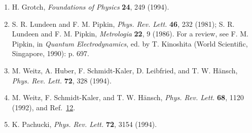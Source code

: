 \begin{enumerate}
\item \hypertarget{ref:14.10}{}H. Grotch, \emph{Foundations of Physics}
\textbf{24}, 249 (1994).

\item \hypertarget{ref:14.11}{}S. R. Lundeen and F. M. Pipkin,
\emph{Phys. Rev. Lett.} \textbf{46}, 232 (1981); S. R. Lundeen and
F. M. Pipkin, \emph{Metrologia} \textbf{22}, 9 (1986). For a review, see
F. M. Pipkin, in \emph{Quantum Electrodynamics}, ed. by T. Kinoshita (World
Scientific, Singapore, 1990): p. 697.

\item \hypertarget{ref:14.12}{}M. Weitz, A. Huber, F. Schmidt-Kaler,
D. Leibfried, and T. W. H\"ansch, \emph{Phys. Rev. Lett.} \textbf{72}, 328
(1994).

\item \hypertarget{ref:14.13}{}M. Weitz, F. Schmidt-Kaler, and T. W. H\"ansch,
\emph{Phys. Rev. Lett.} \textbf{68}, 1120 (1992), and
Ref.~\hyperlink{ref:14.12}{12}.

\item \hypertarget{ref:14.14}{}K. Pachucki, \emph{Phys. Rev. Lett.}
\textbf{72}, 3154 (1994).
\end{enumerate}
